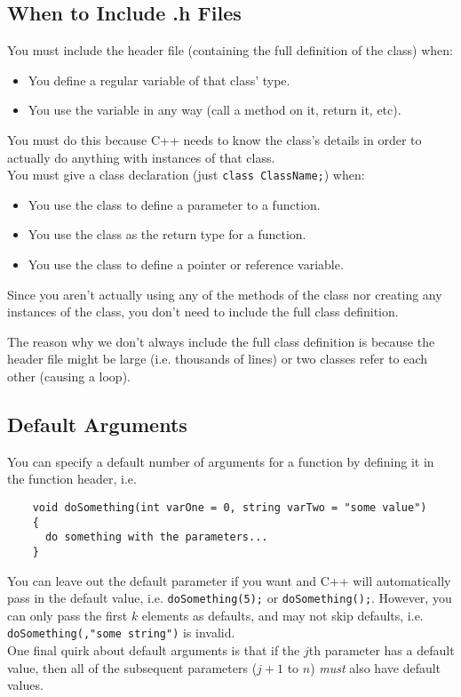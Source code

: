 \documentclass[class=article, crop=false]{standalone}
\begin{document}
  \subsection{When to Include .h Files}
  You must include the header file (containing the full definition of the class) when:
  \begin{itemize}
    \item You define a regular variable of that class' type.
    \item You use the variable in any way (call a method on it, return it, etc).
  \end{itemize}
  You must do this because C++ needs to know the class's details in order to actually do anything with instances of that class. \\[10pt]
  You must give a class declaration (just \texttt{class ClassName;}) when:
  \begin{itemize}
    \item You use the class to define a parameter to a function.
    \item You use the class as the return type for a function.
    \item You use the class to define a pointer or reference variable.
  \end{itemize}
  Since you aren't actually using any of the methods of the class nor creating any instances of the class, you don't need to include the full class definition.
  \begin{note}{}
    The reason why we don't always include the full class definition is because the header file might be large (i.e. thousands of lines) or two classes refer to each other (causing a loop).
  \end{note}
  \subsection{Default Arguments}
  You can specify a default number of arguments for a function by defining it in the function header, i.e.
  \begin{lstlisting}
    void doSomething(int varOne = 0, string varTwo = "some value")
    {
      do something with the parameters...
    }
  \end{lstlisting}
  You can leave out the default parameter if you want and C++ will automatically pass in the default value, i.e. \texttt{doSomething(5);} or \texttt{doSomething();}. However, you can only pass the first $k$ elements as defaults, and may not skip defaults, i.e. \texttt{doSomething(,"some string")} is invalid. \\[10pt]
  One final quirk about default arguments is that if the $j$th parameter has a default value, then all of the subsequent parameters ($j+1$ to $n$) \emph{must} also have default values.
\end{document}
